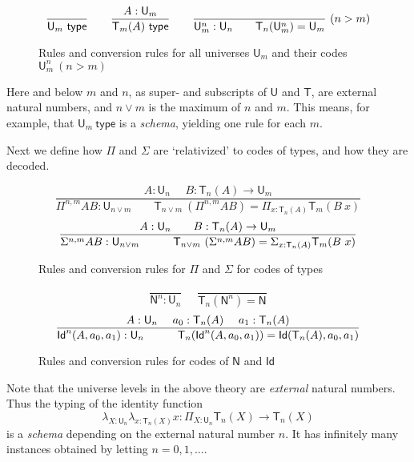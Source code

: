\documentclass[11pt,a4paper]{article}
\theoremstyle{definition}
\newcommand{\Id}{\mathsf{Id}}
\newcommand{\NN}{\mathsf{N}}
\newcommand{\UU}{\mathsf{U}}
\newcommand{\type}{\mathsf{type}}
\newcommand{\mypi}[3]{\Pi_{#1:#2}#3}
\newcommand{\mylam}[3]{\lambda_{#1:#2}#3}
\newcommand{\sapp}[2]{{#1(#2)}} %
\newcommand{\Idapp}[3]{\sapp{\Id}{#1,#2,#3}}
\newcommand{\Idnapp}[4]{\sapp{\Id^#4}{#1,#2,#3}}
\newcommand{\mysig}[3]{\Sigma_{#1:#2}#3}
\newcommand{\T}{\mathsf{T}}
\begin{document}
\begin{figure}[H]
  \caption{Rules and conversion rules for all universes $\UU_m$ and their codes $\UU^{n}_{m}~(n>m)$}\label{fig:typeU}
$$
\frac{}{\UU_m~\type}~~~~~~
\frac{A:\UU_{m}}{\T_{m}(A)~\type}~~~~~~
\frac{}{\UU^{n}_{m}:\UU_{n}~~~~~~\T_{n}({\UU^{n}_{m}}) = \UU_{m}}{~(n>m)}
\belowdisplayshortskip 0pt
$$
\end{figure}

Here and below $m$ and $n$, as super- and subscripts of $\UU$ and $\T$,
are external natural numbers, and $n \vee m$ is the
maximum of $n$ and $m$. This means, for example, that $\UU_m~\type$ is
a \emph{schema}, yielding one rule for each $m$.

Next we define how $\Pi$ and $\Sigma$ are `relativized' to
codes of types, and how they are decoded.

\begin{figure}[H]
  \caption{Rules and conversion rules for $\Pi$ and $\Sigma$ for codes of types}\label{fig:PiSigU}
$$
\frac{A:\UU_{n}~~~~~~B:\T_{n}(A)\rightarrow \UU_{m}}
     {\Pi^{n,m} A B:\UU_{n\vee m}~~~~~~~~~
      \T_{n\vee m}~(\Pi^{n,m} A B) = \mypi{x}{\T_{n}(A)}{ \T_{m}(B~x)}}
$$
$$
\frac{A:\UU_{n}~~~~~~B:\T_{n}(A)\rightarrow \UU_{m}}
     {\Sigma^{n,m} A B:\UU_{n\vee m}~~~~~~~~~
     \T_{n\vee m}~(\Sigma^{n,m} A B) = \mysig {x}{\T_{n}(A)}{ \T_{m}(B~x)}}
\belowdisplayshortskip -1pt
$$
\end{figure}

\begin{figure}[H]
\caption{Rules and conversion rules for codes of $\NN$ and $\Id$}\label{fig:NIdU}
$$
\frac{}{\NN^{n}:\UU_{n}}~~~~~~\frac{}{\T_{n}(\NN^{n}) = \NN}
$$
$$
\frac{A:\UU_n~~~~a_0:\T_n(A)~~~~a_1:\T_n(A)}
{\Idnapp{A}{a_0}{a_1}{n}:\UU_n ~~~~~~~~~ \T_n(\Idnapp{A}{a_0}{a_1}{n}) = \Idapp{{\T_n(A)}}{a_0}{a_1} }
\belowdisplayshortskip 1pt
$$
\end{figure}


Note that the universe levels in the above theory are
\emph{external} natural numbers.
Thus the typing of the identity function
$$\mylam{X}{\UU_n}{\mylam{x}{\T_n(X)}{x}} :
      \mypi{X}{\UU_n}{\T_n(X)\rightarrow \T_n(X)}$$
is a \emph{schema}  depending on the external natural number $n$.
It has infinitely many instances obtained by letting  $n = 0,1,\dots$.
\end{document}
